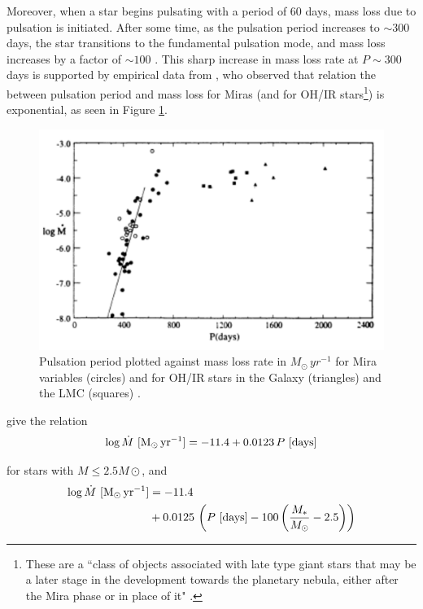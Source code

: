 \documentclass[twocolumn]{aastex63}
\begin{document}
Moreover, when a star begins pulsating with a period of 60 days, mass loss due to pulsation is initiated. After some time, as the pulsation period increases to $\sim 300$ days, the star transitions to the fundamental pulsation mode, and mass loss increases by a factor of $\sim 100$ \citep{mcdonald, bedijn}. This sharp increase in mass loss rate at $P\sim 300$ days is supported by empirical data from \cite{vassiliadis}, who observed that relation the between pulsation period and mass loss for Miras (and for OH/IR stars\footnote{These are a ``class of objects associated with late type giant stars that may be a later stage in the development towards the planetary nebula, either after the Mira phase or in place of it" \citep{pottasch}.}) is exponential, as seen in Figure \ref{fig:pulsation_massloss}.
\begin{figure}[ht]
    \includegraphics[width=\textwidth]{pulsation_massloss.png}
    \caption{Pulsation period plotted against mass loss rate in $M_\odot\,yr^{-1}$ for Mira variables (circles) and for OH/IR stars in the Galaxy (triangles) and the LMC (squares) \citep{vassiliadis}.}
    \label{fig:pulsation_massloss}
\end{figure}

\cite{vassiliadis} give the relation 
\begin{align}\label{eq:mlpsub2.5}
    \log \dot M~{[\rm M_\odot\,yr^{-1}]} = -11.4 + 0.0123\,P~{[\rm days]}
\end{align}

for stars with $M\leq 2.5M\odot$, and
\begin{align}\label{eq:mlpover2.5}
    \log \dot M~{[\rm M_\odot\,yr^{-1}]} &= -11.4 \\
    &+ 0.0125\,\left(P~{[\rm days]} - 100\left(\frac{M_*}{M_\odot} - 2.5\right)\right) \nonumber
\end{align}
\end{document}

